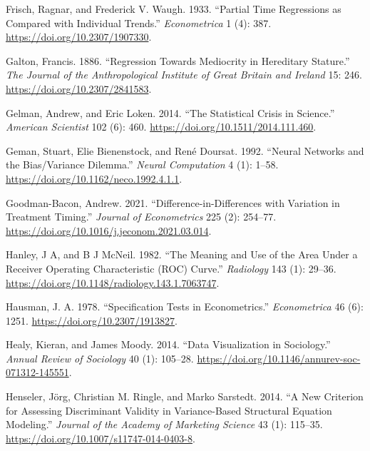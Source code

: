 \documentclass[
  letterpaper,
  10pt,
  twoside,
  openright,
  numbers=noenddot,
  chapterprefix=true]{scrbook}
\newlength{\cslhangindent}
\newenvironment{CSLReferences}[2] %
 {\begin{list}{}{%
  \setlength{\itemindent}{0pt}
  \setlength{\leftmargin}{0pt}
  \setlength{\parsep}{0pt}
  \ifodd #1
   \setlength{\leftmargin}{\cslhangindent}
   \setlength{\itemindent}{-1\cslhangindent}
  \fi
  \setlength{\itemsep}{#2\baselineskip}}}
 {\end{list}}
\begin{document}
\begin{CSLReferences}{1}{0}
Frisch, Ragnar, and Frederick V. Waugh. 1933. {``{Partial} {Time}
{Regressions} as {Compared} with {Individual} {Trends}.''}
\emph{{Econometrica}} 1 (4): 387. \url{https://doi.org/10.2307/1907330}.

Galton, Francis. 1886. {``{Regression} {Towards} {Mediocrity} in
{Hereditary} {Stature}.''} \emph{{The} {Journal} of the
{Anthropological} {Institute} of {Great} {Britain} and {Ireland}} 15:
246. \url{https://doi.org/10.2307/2841583}.

Gelman, Andrew, and Eric Loken. 2014. {``{The} {Statistical} {Crisis} in
{Science}.''} \emph{{American} {Scientist}} 102 (6): 460.
\url{https://doi.org/10.1511/2014.111.460}.

Geman, Stuart, Elie Bienenstock, and René Doursat. 1992. {``{Neural}
{Networks} and the {Bias}/{Variance} {Dilemma}.''} \emph{{Neural}
{Computation}} 4 (1): 1--58.
\url{https://doi.org/10.1162/neco.1992.4.1.1}.

Goodman-Bacon, Andrew. 2021. {``{Difference}-in-Differences with
Variation in Treatment Timing.''} \emph{{Journal} of {Econometrics}} 225
(2): 254--77. \url{https://doi.org/10.1016/j.jeconom.2021.03.014}.

Hanley, J A, and B J McNeil. 1982. {``{The} Meaning and Use of the Area
Under a Receiver Operating Characteristic ({ROC}) Curve.''}
\emph{{Radiology}} 143 (1): 29--36.
\url{https://doi.org/10.1148/radiology.143.1.7063747}.

Hausman, J. A. 1978. {``{Specification} {Tests} in {Econometrics}.''}
\emph{{Econometrica}} 46 (6): 1251.
\url{https://doi.org/10.2307/1913827}.

Healy, Kieran, and James Moody. 2014. {``{Data} {Visualization} in
{Sociology}.''} \emph{{Annual} {Review} of {Sociology}} 40 (1): 105--28.
\url{https://doi.org/10.1146/annurev-soc-071312-145551}.

Henseler, Jörg, Christian M. Ringle, and Marko Sarstedt. 2014. {``A New
Criterion for Assessing Discriminant Validity in Variance-Based
Structural Equation Modeling.''} \emph{{Journal} of the {Academy} of
{Marketing} {Science}} 43 (1): 115--35.
\url{https://doi.org/10.1007/s11747-014-0403-8}.


\end{CSLReferences}
\end{document}
